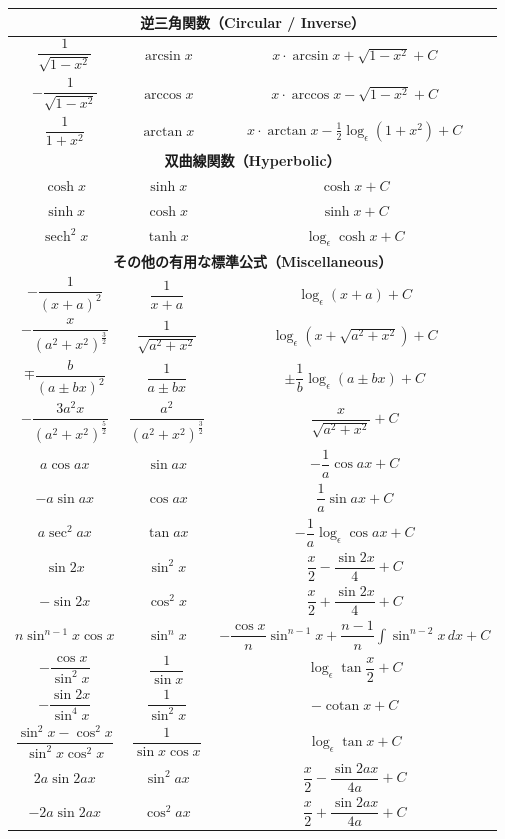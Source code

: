 \documentclass[a4paper,11pt,openany]{ltjsbook}
\DeclareMathOperator{\cotan}{cotan}
\DeclareMathOperator{\sech}{sech}
\begin{document}
\begin{center}
\begin{tabular}{|c|c|c|}
\hline
\multicolumn{3}{|c|}{\textbf{逆三角関数（Circular / Inverse）}} \\
\hline
$\dfrac{1}{\sqrt{1-x^2}}$ & $\arcsin x$ & $x \cdot \arcsin x + \sqrt{1 - x^2} + C$ \\
$-\dfrac{1}{\sqrt{1-x^2}}$ & $\arccos x$ & $x \cdot \arccos x - \sqrt{1 - x^2} + C$ \\
$\dfrac{1}{1+x^2}$ & $\arctan x$ & $x \cdot \arctan x - \frac{1}{2} \log_\epsilon (1 + x^2) + C$ \\
\hline
\multicolumn{3}{|c|}{\textbf{双曲線関数（Hyperbolic）}} \\
\hline
$\cosh x$ & $\sinh x$ & $\cosh x + C$ \\
$\sinh x$ & $\cosh x$ & $\sinh x + C$ \\
$\sech^2 x$ & $\tanh x$ & $\log_\epsilon \cosh x + C$ \\
\hline
\multicolumn{3}{|c|}{\textbf{その他の有用な標準公式（Miscellaneous）}} \\
\hline
$-\dfrac{1}{(x + a)^2}$ & $\dfrac{1}{x + a}$ & $\log_\epsilon (x+a) + C$ \\
$-\dfrac{x}{(a^2 + x^2)^{\frac{3}{2}}}$ & $\dfrac{1}{\sqrt{a^2 + x^2}}$ & $\log_\epsilon (x + \sqrt{a^2 + x^2}) + C$ \\
$\mp \dfrac{b}{(a \pm bx)^2}$ & $\dfrac{1}{a \pm bx}$ & $\pm \dfrac{1}{b} \log_\epsilon (a \pm bx) + C$ \\
$-\dfrac{3a^2x}{(a^2 + x^2)^{\frac{5}{2}}}$ & $\dfrac{a^2}{(a^2 + x^2)^{\frac{3}{2}}}$ & $\dfrac{x}{\sqrt{a^2 + x^2}} + C$ \\
$a \cos ax$ & $\sin ax$ & $-\dfrac{1}{a} \cos ax + C$ \\
$-a \sin ax$ & $\cos ax$ & $\dfrac{1}{a} \sin ax + C$ \\
$a \sec^2 ax$ & $\tan ax$ & $-\dfrac{1}{a} \log_\epsilon \cos ax + C$ \\
$\sin 2x$ & $\sin^2 x$ & $\dfrac{x}{2} - \dfrac{\sin 2x}{4} + C$ \\
$-\sin 2x$ & $\cos^2 x$ & $\dfrac{x}{2} + \dfrac{\sin 2x}{4} + C$ \\
$n \sin^{n-1} x \cos x$ & $\sin^n x$ & $-\dfrac{\cos x}{n} \sin^{n-1} x + \dfrac{n-1}{n} \int \sin^{n-2} x\, dx + C$ \\
$-\dfrac{\cos x}{\sin^2 x}$ & $\dfrac{1}{\sin x}$ & $\log_\epsilon \tan \dfrac{x}{2} + C$ \\
$-\dfrac{\sin 2x}{\sin^4 x}$ & $\dfrac{1}{\sin^2 x}$ & $-\cotan x + C$ \\
$\dfrac{\sin^2 x - \cos^2 x}{\sin^2 x \cos^2 x}$ & $\dfrac{1}{\sin x \cos x}$ & $\log_\epsilon \tan x + C$ \\
$2a \sin 2ax$ & $\sin^2 ax$ & $\dfrac{x}{2} - \dfrac{\sin 2ax}{4a} + C$ \\
$-2a \sin 2ax$ & $\cos^2 ax$ & $\dfrac{x}{2} + \dfrac{\sin 2ax}{4a} + C$ \\
\hline
\end{tabular}
\end{center}
\end{document}
